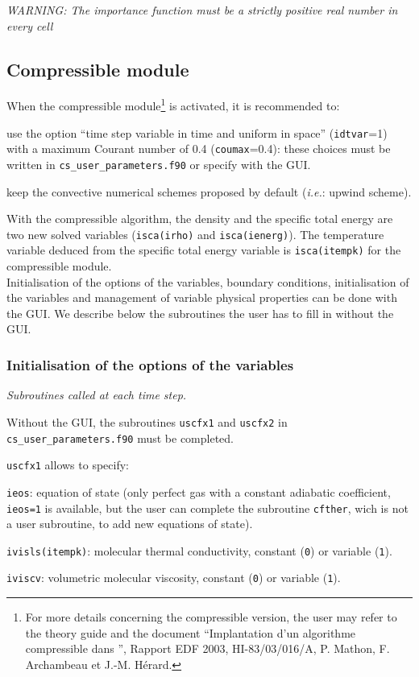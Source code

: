 {{\noindent
\emph{WARNING: The importance function must be a strictly positive real
number in every cell}

\subsection{Compressible module}

When the compressible module\footnote{For more details concerning the
compressible version, the user may refer to the theory guide \cite{theory} and the document ``Implantation
d'un algorithme compressible dans \CS'', Rapport EDF 2003,
HI-83/03/016/A, P. Mathon, F. Archambeau et J.-M. H\'erard.} is
activated, it is recommended to:
\begin{list}{-}{}
 \item use the option ``time step variable in time and uniform in
       space'' (\texttt{idtvar}=1) with a maximum Courant number of 0.4
       (\texttt{coumax}=0.4): these choices must be written in \texttt{cs\_user\_parameters.f90}
       or specify with the GUI.
 \item keep the convective numerical schemes proposed by default (\textit{i.e.}: upwind scheme).
\end{list}
With the compressible algorithm, the density and the specific total energy are two new solved variables 
(\texttt{isca(irho)} and \texttt{isca(ienerg)}). The temperature variable deduced from the specific 
total energy variable is \texttt{isca(itempk)} for the compressible module.\\
Initialisation of the options of the variables, boundary conditions, initialisation of the variables and 
management of variable physical properties can be done with the GUI. We describe below the subroutines
the user has to fill in without the GUI.

\subsubsection{ Initialisation of the options of the variables}
\label{prg_uscfx12}%
\noindent
\textit{Subroutines called at each time step.}

Without the GUI, the subroutines \texttt{uscfx1} and \texttt{uscfx2} in \texttt{cs\_user\_parameters.f90}
must be completed.

\texttt{uscfx1} allows to specify:
\begin{list}{-}{}
\item \texttt{ieos}: equation of state (only perfect gas with a constant adiabatic coefficient,
                      \texttt{ieos=1} is available, but the user can complete the subroutine 
                      \texttt{cfther}, wich is not a user subroutine, to add new equations of state).
\item \texttt{ivisls(itempk)}: molecular thermal conductivity, constant (\texttt{0}) or variable (\texttt{1}).
\item  \texttt{iviscv}: volumetric molecular viscosity, constant (\texttt{0}) or variable (\texttt{1}).
\end{list}

}}
